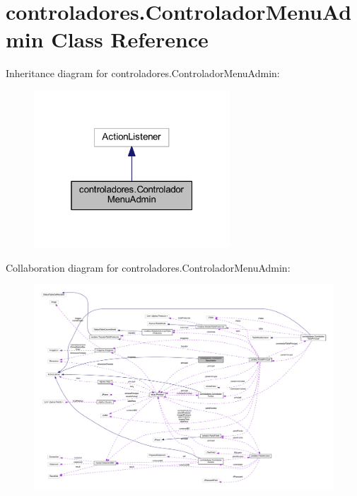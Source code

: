 \hypertarget{classcontroladores_1_1_controlador_menu_admin}{}\section{controladores.\+Controlador\+Menu\+Admin Class Reference}
\label{classcontroladores_1_1_controlador_menu_admin}


Inheritance diagram for controladores.\+Controlador\+Menu\+Admin\+:\nopagebreak
\begin{figure}[H]
\begin{center}
\leavevmode
\includegraphics[width=208pt]{classcontroladores_1_1_controlador_menu_admin__inherit__graph}
\end{center}
\end{figure}


Collaboration diagram for controladores.\+Controlador\+Menu\+Admin\+:\nopagebreak
\begin{figure}[H]
\begin{center}
\leavevmode
\includegraphics[width=350pt]{classcontroladores_1_1_controlador_menu_admin__coll__graph}
\end{center}
\end{figure}
